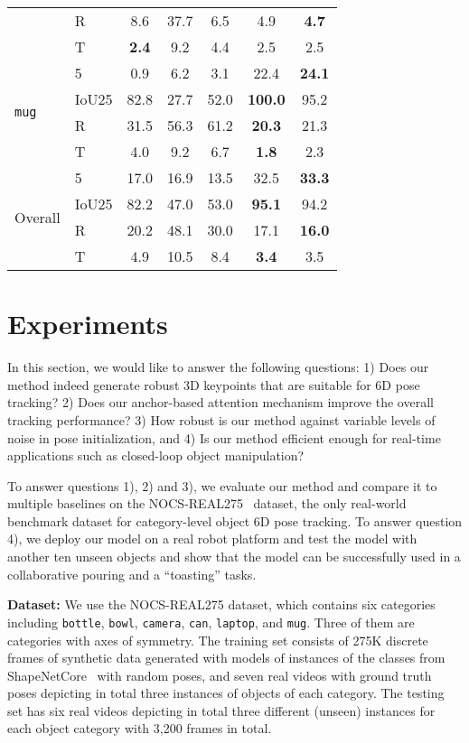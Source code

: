 \documentclass[letterpaper, 10 pt, conference]{ieeeconf}
\begin{document}
\begin{table}[htb]
\begin{tabular}{|l|l|c|c|c|c|c|}
 & R & 8.6 & 37.7 & 6.5 & 4.9 & \textbf{4.7} \\
 & T & \textbf{2.4} & 9.2 & 4.4 & 2.5 & 2.5 \\ \hline
\multirow{4}{*}{\texttt{mug}} & 5\textdegree 5cm & 0.9 & 6.2 & 3.1 & 22.4 & \textbf{24.1} \\ 
 & IoU25 & 82.8 & 27.7 & 52.0 & \textbf{100.0} & 95.2 \\
 & R & 31.5 & 56.3 & 61.2 & \textbf{20.3} & 21.3 \\
 & T & 4.0 & 9.2 & 6.7 & \textbf{1.8} & 2.3 \\ \hline\hline
\multirow{4}{*}{Overall} & 5\textdegree 5cm & 17.0 & 16.9 & 13.5 & 32.5 & \textbf{33.3} \\
 & IoU25 & 82.2 & 47.0 & 53.0 & \textbf{95.1} & 94.2 \\
 & R & 20.2 & 48.1 & 30.0 & 17.1 & \textbf{16.0} \\ 
 & T & 4.9 & 10.5 & 8.4 & \textbf{3.4} & 3.5 \\ \hline
\end{tabular}
\label{tab:nocs}
\vspace{-4mm}
\end{table}

\section{Experiments}
\label{s:exp}

In this section, we would like to answer the following questions: 1) Does our method indeed generate robust 3D keypoints that are suitable for 6D pose tracking? 2) Does our anchor-based attention mechanism improve the overall tracking performance? 3) How robust is our method against variable levels of noise in pose initialization, and 4) Is our method efficient enough for real-time applications such as closed-loop object manipulation?

To answer questions 1), 2) and 3), we evaluate our method and compare it to multiple baselines on the NOCS-REAL275~\cite{wang2019normalized} dataset, the only real-world benchmark dataset for category-level object 6D pose tracking. To answer question 4), we deploy our model on a real robot platform and test the model with another ten unseen objects and show that the model can be successfully used in a collaborative pouring and a ``toasting'' tasks. 

\textbf{Dataset:}
We use the NOCS-REAL275 dataset, which contains six categories including \texttt{bottle}, \texttt{bowl}, \texttt{camera}, \texttt{can}, \texttt{laptop}, and \texttt{mug}. Three of them are categories with axes of symmetry. The training set consists of 275K discrete frames of synthetic data generated with  models of instances of the classes from ShapeNetCore~\cite{chang2015shapenet} with random poses, and seven real videos with ground truth poses depicting in total three instances of objects of each category. The testing set has six real videos depicting in total three different (unseen) instances for each object category with 3,200 frames in total.
\end{document}
